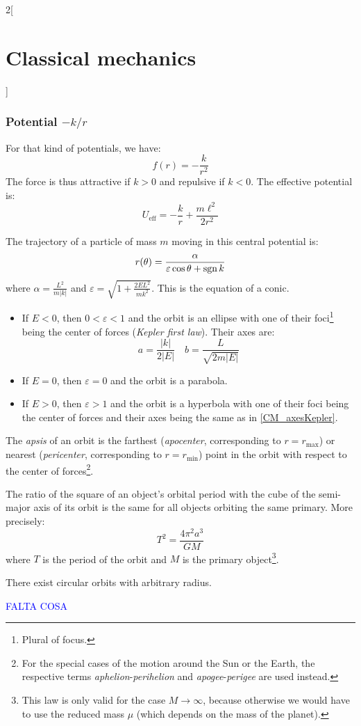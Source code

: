 \documentclass[../../../main.tex]{subfiles}
\begin{document}
\begin{multicols}{2}[\section{Classical mechanics}]
  \subsubsection{Potential \texorpdfstring{$-k/r$}{-k/r}}
  \begin{proposition}
    For that kind of potentials, we have: $$f(r)=-\frac{k}{r^2}$$
    The force is thus attractive if $k>0$ and repulsive if $k<0$. The effective potential is: $$U_\text{eff}=-\frac{k}{r}+\frac{m\ell^2}{2r^2}$$
  \end{proposition}
  \begin{theorem}
    The trajectory of a particle of mass $m$ moving in this central potential is: $$r(\theta)=\frac{\alpha}{\varepsilon\cos\theta+\operatorname{sgn} k}$$ where $\displaystyle\alpha=\frac{L^2}{m|k|}$ and $\displaystyle\varepsilon=\sqrt{1+\frac{2EL^2}{mk^2}}$. This is the equation of a conic.
    \begin{itemize}
      \item If $E<0$, then $0<\varepsilon<1$ and the orbit is an ellipse with one of their foci\footnote{Plural of focus.} being the center of forces (\emph{Kepler first law}). Their axes are:
            \begin{equation}\label{CM_axesKepler}
              a=\frac{|k|}{2|E|}\quad b=\frac{L}{\sqrt{2m|E|}}
            \end{equation}
      \item If $E=0$, then $\varepsilon=0$ and the orbit is a parabola.
      \item If $E>0$, then $\varepsilon>1$ and the orbit is a hyperbola with one of their foci being the center of forces and their axes being the same as in \cref{CM_axesKepler}.
    \end{itemize}
  \end{theorem}
  \begin{definition}
    The \emph{apsis} of an orbit is the farthest (\emph{apocenter}, corresponding to $r=r_\text{max}$) or nearest (\emph{pericenter}, corresponding to $r=r_\text{min}$) point in the orbit with respect to the center of forces\footnote{For the special cases of the motion around the Sun or the Earth, the respective terms \emph{aphelion}-\emph{perihelion} and \emph{apogee}-\emph{perigee} are used instead.}.
  \end{definition}
  \begin{law}
    The ratio of the square of an object's orbital period with the cube of the semi-major axis of its orbit is the same for all objects orbiting the same primary. More precisely: $$T^2=\frac{4\pi^2a^3}{GM}$$ where $T$ is the period of the orbit and $M$ is the primary object\footnote{This law is only valid for the case $M\to\infty$, because otherwise we would have to use the reduced mass $\mu$ (which depends on the mass of the planet).}.
  \end{law}
  \begin{theorem}
    There exist circular orbits with arbitrary radius.
  \end{theorem}
  \textcolor{blue}{FALTA COSA}

\end{multicols}
\end{document}
